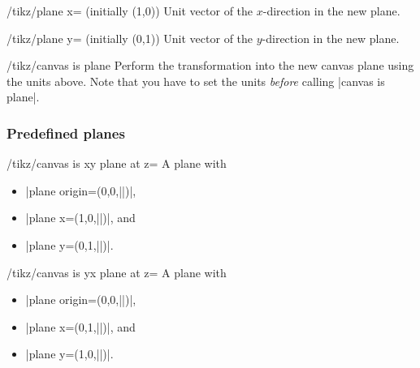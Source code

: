 \begin{key}{/tikz/plane x= (initially {(1,0)})}
    Unit vector of the $x$-direction in the new plane.
\end{key}

\begin{key}{/tikz/plane y= (initially {(0,1)})}
    Unit vector of the $y$-direction in the new plane.
\end{key}

\begin{key}{/tikz/canvas is plane}
    Perform the transformation into the new canvas plane using the units above.
    Note that you have to set the units \emph{before} calling
    |canvas is plane|.
\begin{codeexample}[]
\end{codeexample}
\end{key}


\subsubsection{Predefined planes}

\begin{key}{/tikz/canvas is xy plane at z=}
    A plane with
    \begin{itemize}
        \item |plane origin={(0,0,||)}|,
        \item |plane x={(1,0,||)}|, and
        \item |plane y={(0,1,||)}|.
    \end{itemize}
\end{key}

\begin{key}{/tikz/canvas is yx plane at z=}
    A plane with
    \begin{itemize}
        \item |plane origin={(0,0,||)}|,
        \item |plane x={(0,1,||)}|, and
        \item |plane y={(1,0,||)}|.
    \end{itemize}
\end{key}

